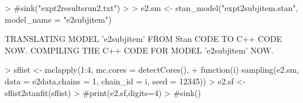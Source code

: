 \documentclass{article}
\begin{document}
\begin{Schunk}
\begin{Sinput}
> #sink("expt2resultsrun2.txt")
> 
> e2.sm <- stan_model("expt2subjitem.stan", model_name = "e2subjitem")
\end{Sinput}
\begin{Soutput}
TRANSLATING MODEL 'e2subjitem' FROM Stan CODE TO C++ CODE NOW.
COMPILING THE C++ CODE FOR MODEL 'e2subjitem' NOW.
\end{Soutput}
\begin{Sinput}
> sflist <- mclapply(1:4, mc.cores = detectCores(),
+                    function(i) sampling(e2.sm, data = e2data,chains = 1, chain_id = i, seed = 12345))
> e2.sf <- sflist2stanfit(sflist)
> #print(e2.sf,digits=4)
> #sink()
\end{Sinput}
\end{Schunk}
\end{document}
